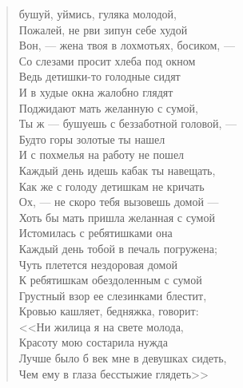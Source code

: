 \begin{verse}
 бушуй, уймись, гуляка молодой,\\
Пожалей, не рви зипун себе худой\ldotst\\
Вон, --- жена твоя в лохмотьях, босиком, ---\\
Со слезами просит хлеба под окном\ldotse\\
Ведь детишки-то голодные сидят\\
И в худые окна жалобно глядят\ldotst\\
Поджидают мать желанную с сумой,\\
Ты ж --- бушуешь с беззаботной головой, ---\\
Будто горы золотые ты нашел\ldotst\\
И с похмелья на работу не пошел\ldotst\\
Каждый день идешь кабак ты навещать,\\
Как же с голоду детишкам не кричать\ldotsq\\
Ох, --- не скоро тебя вызовешь домой ---\\
Хоть бы мать пришла желанная с сумой\ldotst\\
Истомилась с ребятишками она\\
Каждый день тобой в печаль погружена;\\
Чуть плетется нездоровая домой\\
К ребятишкам обездоленным с сумой\ldotst\\
Грустный взор ее слезинками блестит,\\
Кровью кашляет, бедняжка, говорит:\\
<<Ни жилица я на свете молода,\\
Красоту мою состарила нужда\ldotst\\
Лучше было б век мне в девушках сидеть,\\
Чем ему в глаза бесстыжие глядеть>>\ldotst
\end{verse}

